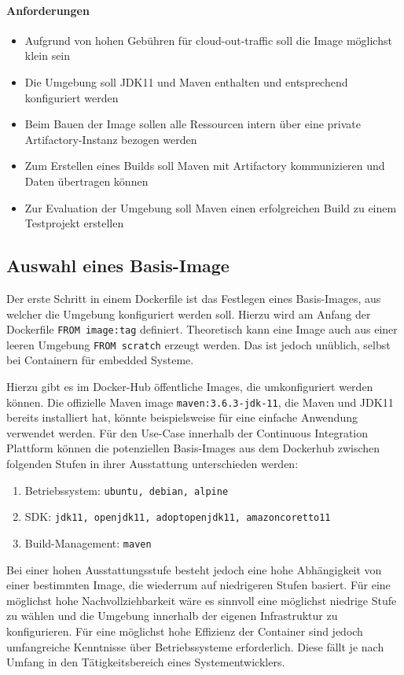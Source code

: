 \paragraph{Anforderungen}
\begin{itemize}
    \item Aufgrund von hohen Gebühren für cloud-out-traffic soll die Image möglichst klein sein
    \item Die Umgebung soll \ac{JDK11} und Maven enthalten und entsprechend konfiguriert werden
    \item Beim Bauen der Image sollen alle Ressourcen intern über eine private Artifactory-Instanz bezogen werden
    \item Zum Erstellen eines Builds soll Maven mit Artifactory kommunizieren und Daten übertragen können
    \item Zur Evaluation der Umgebung soll Maven einen erfolgreichen Build zu einem Testprojekt erstellen
\end{itemize}



\subsection{Auswahl eines Basis-Image}
Der erste Schritt in einem Dockerfile ist das Festlegen eines Basis-Images, aus welcher die Umgebung konfiguriert werden soll. Hierzu wird am Anfang der Dockerfile \lstinline{FROM image:tag} definiert. Theoretisch kann eine Image auch aus einer leeren Umgebung \lstinline{FROM scratch} erzeugt werden. Das ist jedoch unüblich, selbst bei Containern für embedded Systeme.

Hierzu gibt es im Docker-Hub öffentliche Images, die umkonfiguriert werden können. Die offizielle Maven image \lstinline{maven:3.6.3-jdk-11}, die Maven und JDK11 bereits installiert hat, könnte beispielsweise für eine einfache Anwendung verwendet werden. Für den Use-Case innerhalb der Continuous Integration Plattform können die potenziellen Basis-Images aus dem Dockerhub zwischen folgenden Stufen in ihrer Ausstattung unterschieden werden:
\begin{enumerate}
    \item Betriebssystem: \lstinline{ubuntu, debian, alpine}
    \item SDK: \lstinline{jdk11, openjdk11, adoptopenjdk11, amazoncoretto11}
    \item Build-Management: \lstinline{maven}
\end{enumerate}
Bei einer hohen Ausstattungsstufe besteht jedoch eine hohe Abhängigkeit von einer bestimmten Image, die wiederrum auf niedrigeren Stufen basiert. Für eine möglichst hohe Nachvollziehbarkeit wäre es sinnvoll eine möglichst niedrige Stufe zu wählen und die Umgebung innerhalb der eigenen Infrastruktur zu konfigurieren. Für eine möglichst hohe Effizienz der Container sind jedoch umfangreiche Kenntnisse über Betriebssysteme erforderlich. Diese fällt je nach Umfang in den Tätigkeitsbereich eines Systementwicklers.

